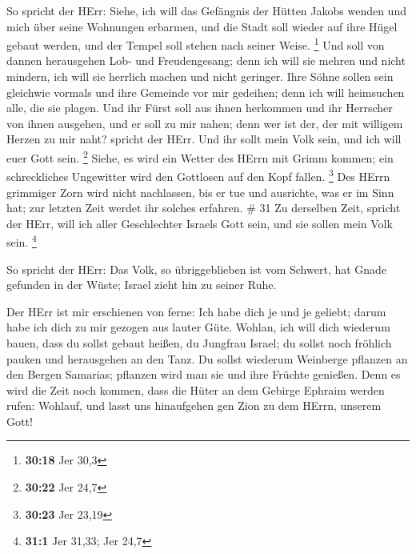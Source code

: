  So spricht der HErr: Siehe, ich will das Gefängnis der
Hütten Jakobs wenden und mich über seine Wohnungen erbarmen, und die
Stadt soll wieder auf ihre Hügel gebaut werden, und der Tempel soll
stehen nach seiner Weise. \footnote{\textbf{30:18} Jer 30,3}
 Und soll von dannen herausgehen Lob- und Freudengesang;
denn ich will sie mehren und nicht mindern, ich will sie herrlich machen
und nicht geringer.  Ihre Söhne sollen sein gleichwie
vormals und ihre Gemeinde vor mir gedeihen; denn ich will heimsuchen
alle, die sie plagen.  Und ihr Fürst soll aus ihnen
herkommen und ihr Herrscher von ihnen ausgehen, und er soll zu mir
nahen; denn wer ist der, der mit willigem Herzen zu mir naht? spricht
der HErr.  Und ihr sollt mein Volk sein, und ich will euer
Gott sein. \footnote{\textbf{30:22} Jer 24,7}  Siehe, es
wird ein Wetter des HErrn mit Grimm kommen; ein schreckliches Ungewitter
wird den Gottlosen auf den Kopf fallen. \footnote{\textbf{30:23} Jer
  23,19}  Des HErrn grimmiger Zorn wird nicht nachlassen,
bis er tue und ausrichte, was er im Sinn hat; zur letzten Zeit werdet
ihr solches erfahren. \# 31  Zu derselben Zeit, spricht der
HErr, will ich aller Geschlechter Israels Gott sein, und sie sollen mein
Volk sein. \footnote{\textbf{31:1} Jer 31,33; Jer 24,7}

 So spricht der HErr: Das Volk, so übriggeblieben ist vom
Schwert, hat Gnade gefunden in der Wüste; Israel zieht hin zu seiner
Ruhe.

 Der HErr ist mir erschienen von ferne: Ich habe dich je und
je geliebt; darum habe ich dich zu mir gezogen aus lauter Güte.
 Wohlan, ich will dich wiederum bauen, dass du sollst gebaut
heißen, du Jungfrau Israel; du sollst noch fröhlich pauken und
herausgehen an den Tanz.  Du sollst wiederum Weinberge
pflanzen an den Bergen Samarias; pflanzen wird man sie und ihre Früchte
genießen.  Denn es wird die Zeit noch kommen, dass die Hüter
an dem Gebirge Ephraim werden rufen: Wohlauf, und lasst uns hinaufgehen
gen Zion zu dem HErrn, unserem Gott!

